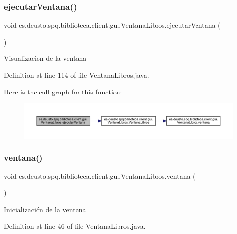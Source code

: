 \subsubsection{\texorpdfstring{ejecutar\+Ventana()}{ejecutarVentana()}}
{\footnotesize\ttfamily void es.\+deusto.\+spq.\+biblioteca.\+client.\+gui.\+Ventana\+Libros.\+ejecutar\+Ventana (\begin{DoxyParamCaption}{ }\end{DoxyParamCaption})}

Visualizacion de la ventana 

Definition at line 114 of file Ventana\+Libros.\+java.

Here is the call graph for this function\+:
\nopagebreak
\begin{figure}[H]
\begin{center}
\leavevmode
\includegraphics[width=350pt]{classes_1_1deusto_1_1spq_1_1biblioteca_1_1client_1_1gui_1_1_ventana_libros_af168d6a20e95444277d58e981b8a9372_cgraph}
\end{center}
\end{figure}
\mbox{\label{classes_1_1deusto_1_1spq_1_1biblioteca_1_1client_1_1gui_1_1_ventana_libros_a6615018a56e392b80c49c4c49a94f55b}} 
\subsubsection{\texorpdfstring{ventana()}{ventana()}}
{\footnotesize\ttfamily void es.\+deusto.\+spq.\+biblioteca.\+client.\+gui.\+Ventana\+Libros.\+ventana (\begin{DoxyParamCaption}{ }\end{DoxyParamCaption})}

Inicialización de la ventana 

Definition at line 46 of file Ventana\+Libros.\+java.

